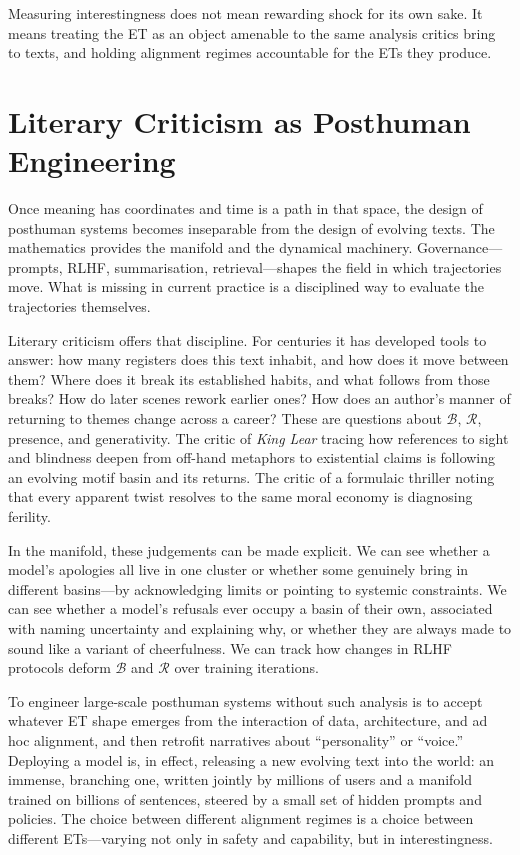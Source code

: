 \documentclass[12pt,a4paper]{article}
\begin{document}
Measuring interestingness does not mean rewarding shock for its own sake. It means treating the ET as an object amenable to the same analysis critics bring to texts, and holding alignment regimes accountable for the ETs they produce.

\section{Literary Criticism as Posthuman Engineering}

Once meaning has coordinates and time is a path in that space, the design of posthuman systems becomes inseparable from the design of evolving texts. The mathematics provides the manifold and the dynamical machinery. Governance---prompts, RLHF, summarisation, retrieval---shapes the field in which trajectories move. What is missing in current practice is a disciplined way to evaluate the trajectories themselves.

Literary criticism offers that discipline. For centuries it has developed tools to answer: how many registers does this text inhabit, and how does it move between them? Where does it break its established habits, and what follows from those breaks? How do later scenes rework earlier ones? How does an author's manner of returning to themes change across a career? These are questions about $\mathcal{B}$, $\mathcal{R}$, presence, and generativity. The critic of \emph{King Lear} tracing how references to sight and blindness deepen from off-hand metaphors to existential claims is following an evolving motif basin and its returns. The critic of a formulaic thriller noting that every apparent twist resolves to the same moral economy is diagnosing ferility.

In the manifold, these judgements can be made explicit. We can see whether a model's apologies all live in one cluster or whether some genuinely bring in different basins---by acknowledging limits or pointing to systemic constraints. We can see whether a model's refusals ever occupy a basin of their own, associated with naming uncertainty and explaining why, or whether they are always made to sound like a variant of cheerfulness. We can track how changes in RLHF protocols deform $\mathcal{B}$ and $\mathcal{R}$ over training iterations.

To engineer large-scale posthuman systems without such analysis is to accept whatever ET shape emerges from the interaction of data, architecture, and ad hoc alignment, and then retrofit narratives about ``personality'' or ``voice.'' Deploying a model is, in effect, releasing a new evolving text into the world: an immense, branching one, written jointly by millions of users and a manifold trained on billions of sentences, steered by a small set of hidden prompts and policies. The choice between different alignment regimes is a choice between different ETs---varying not only in safety and capability, but in interestingness.
\end{document}
